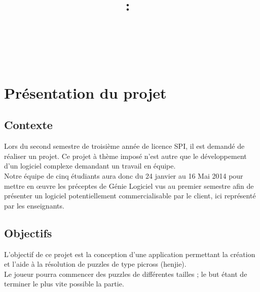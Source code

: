 \documentclass[11pt]{article}
\title{
\pagenumbering{roman} \setcounter{page}{0} %
\vspace{2in}
\textmd{\textbf{\hmwkClass:\ \hmwkTitle}}\\
\normalsize\vspace{0.1in}\small{\hmwkDueDate}\\
\vspace{0.1in}\large{\textit{\hmwkClassInstructor\ }}
\vspace{3in}
}
\author{\textbf{\hmwkAuthorName}}
\date{\hmwkAuthorClasse} %
\begin{document}
\thispagestyle{empty}
\maketitle
\newpage




\thispagestyle{empty}
 \setcounter{page}{0} %
\renewcommand\contentsname{Sommaire}
\tableofcontents
\newpage



\section{Présentation du projet}

\subsection{Contexte}

Lors du second semestre de troisième année de licence SPI, il est demandé de réaliser un projet. Ce projet à thème imposé n'est autre que le développement d'un logiciel complexe demandant un travail en équipe.\\
Notre équipe de cinq étudiants aura donc du 24 janvier au 16 Mai 2014 pour mettre en œuvre les préceptes de Génie
Logiciel vus au premier semestre afin de présenter un logiciel potentiellement commercialisable par le client, ici représenté par les enseignants.

\subsection{Objectifs}

L'objectif de ce projet est la conception d'une application permettant la création et l'aide à la résolution de puzzles de type picross (henjie).\\
Le joueur pourra commencer des puzzles de différentes tailles ; le but étant de terminer le plus vite possible la partie.
\end{document}
